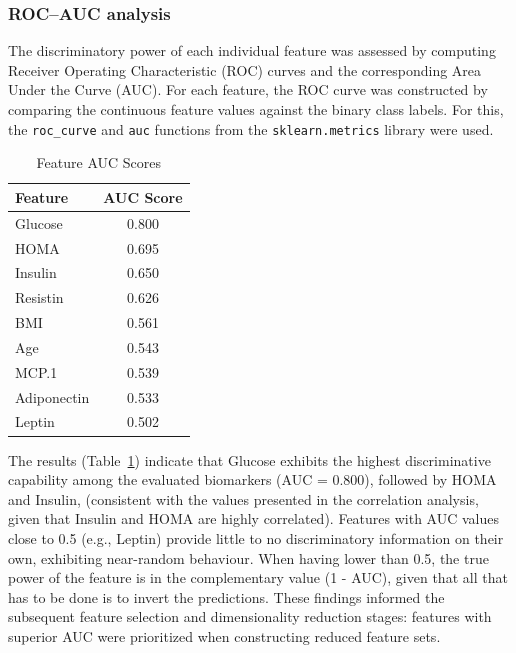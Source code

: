 \documentclass[12pt,a4paper]{article}
\begin{document}
\subsubsection{ROC–AUC analysis}
The discriminatory power of each individual feature was assessed by computing Receiver Operating Characteristic (ROC) curves and the corresponding Area Under the Curve (AUC). For each feature, the ROC curve was constructed by comparing the continuous feature values against the binary class labels. For this, the \texttt{roc\_curve} and \texttt{auc} functions from the \texttt{sklearn.metrics} library were used.



\begin{table}[H]
    \centering
        \begin{tabular}{@{}lc@{}}
                \toprule
                \textbf{Feature} & \textbf{AUC Score} \\
            \midrule
            Glucose & 0.800 \\
            HOMA & 0.695 \\
            Insulin & 0.650 \\
            Resistin & 0.626 \\
            BMI & 0.561 \\
            Age & 0.543 \\
            MCP.1 & 0.539 \\
            Adiponectin & 0.533 \\
            Leptin & 0.502 \\
            \bottomrule
        \end{tabular}
        \caption{Feature AUC Scores}
        \label{tab:auc}
\end{table}

The results (Table~\ref{tab:auc}) indicate that Glucose exhibits the highest discriminative capability among the evaluated biomarkers (AUC = 0.800), followed by HOMA and Insulin, (consistent with the values presented in the correlation analysis, given that Insulin and HOMA are highly correlated). Features with AUC values close to 0.5 (e.g., Leptin) provide little to no discriminatory information on their own, exhibiting near-random behaviour. When having lower than 0.5, the true power of the feature is in the complementary value (1 - AUC), given that all that has to be done is to invert the predictions. These findings informed the subsequent feature selection and dimensionality reduction stages: features with superior AUC were prioritized when constructing reduced feature sets.
\end{document}
